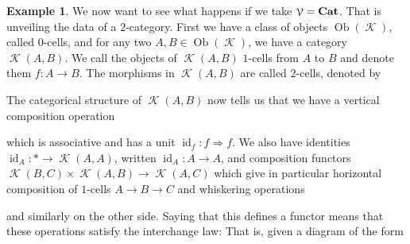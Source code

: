 \documentclass[a4paper,11pt,oneside,openany]{scrbook}
\newcommand{\catname}[1]{{\normalfont\textbf{#1}}}
\newcommand{\Cat}{\catname{Cat}}
\newcommand{\from}{\colon}
\DeclareMathOperator{\K}{\mathcal{K}}
\DeclareMathOperator{\V}{\mathcal{V}}
\DeclareMathOperator{\id}{id}
\DeclareMathOperator{\Ob}{Ob}
\theoremstyle{definition}
\theoremstyle{definition}
\newtheorem{exmp}[thm]{Example}
\begin{document}
\begin{exmp}
   We now want to see what happens if we take $\V = \Cat$. That is unveiling the data of a $2$-category. First we have a class of objects 
   $\Ob(\K)$, called $0$-cells, and for any two $A,B \in \Ob(\K)$, we have a category $\K(A,B)$. We call the objects of $\K(A,B)$ $1$-cells from $A$ 
   to $B$ and denote them $f \from A \to B$. The morphisms in $\K(A,B)$ are called $2$-cells, denoted by 
      \begin{center}
      \end{center}
   The categorical structure of $\K(A,B)$ now tells us that we have a vertical composition operation
      \begin{center}
      \end{center}
   which is associative and has a unit $\id_{f} \from f \Rightarrow f$. We also have identities $\id_{A} \from \ast \to \K(A,A)$, written $\id_{A} \from A \to A$, and
   composition functors $\K(B,C) \times \K(A,B) \to \K(A,C)$ which give in particular horizontal composition of $1$-cells $A \to B \to C$ and whiskering operations
      \begin{center}
      \end{center}
   and similarly on the other side. Saying that this defines a functor means that these operations satisfy the interchange law: That is, given a diagram of the 
   form
      \begin{center}
         \begin{tikzcd}

\end{tikzcd}
\end{center}
\end{exmp}
\end{document}
